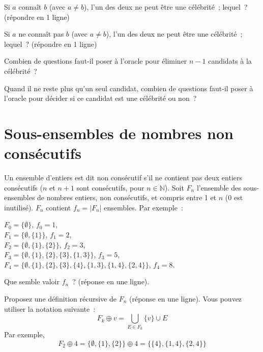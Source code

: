 \documentclass[11pt]{article}
\def\N{\mathbb N}
\begin{document}
Si $a$ connaît $b$ (avec $a\neq b$), l'un des deux ne peut être une célébrité~; lequel~? (répondre en 1 ligne)

\else\fi

Si $a$ ne connaît pas $b$ (avec $a\neq b$), l'un des deux ne peut être une célébrité~; lequel~? (répondre en 1 ligne)

\else\fi

Combien de questions faut-il poser à l'oracle
pour éliminer $n-1$ candidats à la célébrité~?

\else\fi

Quand il ne reste plus qu'un seul candidat, combien de questions faut-il poser à l'oracle
pour décider si ce candidat est une célébrité ou non~? 

\else\fi



\section{Sous-ensembles de nombres non consécutifs}
Un ensemble d'entiers est dit non consécutif s'il ne contient pas deux entiers consécutifs ($n$ et $n+1$ sont consécutifs, pour $n\in \N$).
Soit  $F_n$ l'ensemble des sous-ensembles de nombres entiers, non consécutifs, et compris entre 1 et $n$ (0 est inutilisé).  $F_n$ contient $f_n=|F_n|$ ensembles.
Par exemple~:

\indent $F_0=\{ \emptyset \}$,  $f_0=1 $, \\
\indent $F_1= \{ \emptyset, \{1\}\}$, $f_1= 2$,\\
\indent $F_2= \{ \emptyset, \{1\}, \{2\} \}$, $f_2=3$,\\
\indent $F_3= \{ \emptyset, \{1\}, \{2\}, \{3\}, \{1, 3\}\}$, $f_3=5 $,\\
\indent $F_4= \{ \emptyset, \{1\}, \{2\}, \{3\}, \{4\},  \{1, 3\}, \{1, 4\}, \{2, 4 \}\}$, $f_4=8$.


Que semble valoir $f_n$~? (réponse en une ligne).

\else\fi


Proposez une définition récursive de $F_n$ (réponse en une ligne).
Vous pouvez utiliser la notation suivante~:
$$F_k \oplus v= \bigcup_{E\in F_k} \{v\} \cup E$$
Par exemple,
$$F_2 \oplus 4= \{ \emptyset, \{1\}, \{2\} \} \oplus 4= \{ \{4\}, \{1,4\},  \{2, 4\}  \}$$
\end{document}
